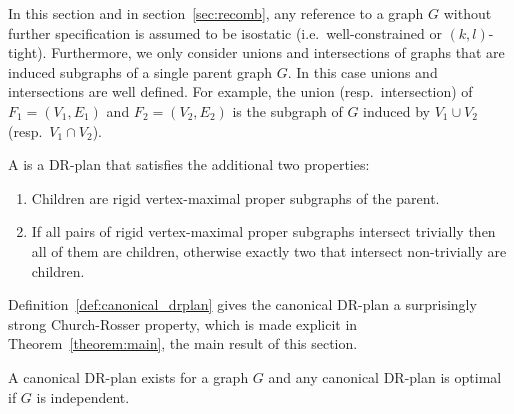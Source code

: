 In this section and in section~\ref{sec:recomb}, any reference to a graph $G$ without further specification is assumed to be isostatic (i.e.\ well-constrained or $(k,l)$-tight). Furthermore, we only consider unions and intersections of graphs that are induced subgraphs of a single parent graph $G$. In this case unions and intersections are well defined. For example, the union (resp.\ intersection) of $F_1 = (V_1, E_1)$ and $F_2 = (V_2, E_2)$ is the subgraph of $G$ induced by $V_1\cup V_2$ (resp.\ $V_1\cap V_2$).




\begin{definition}
\label{def:canonical_drplan}
    A  is a DR-plan that satisfies the additional two properties:
    \begin{enumerate}
        \item \label{def:canonical_drplan:prop1} Children are rigid vertex-maximal proper subgraphs of the parent.
        \item \label{def:canonical_drplan:prop2} If all pairs of rigid vertex-maximal proper subgraphs intersect trivially then all of them are children, otherwise exactly two that intersect non-trivially are children.
    \end{enumerate}
\end{definition}

Definition~\ref{def:canonical_drplan} gives the canonical DR-plan a surprisingly strong Church-Rosser property, which is made explicit in Theorem~\ref{theorem:main}, the main result of this section.

\begin{theorem}
\label{theorem:canonical_exists_and_is_optimal}
\label{theorem:canonical_is_optimal}
\label{theorem:main}
    A canonical DR-plan exists for a graph $G$ and any canonical DR-plan is optimal if $G$ is independent.
\end{theorem}


